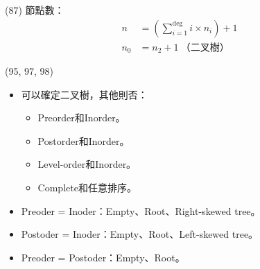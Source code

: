 \item \begin{theorem}{(87)} 節點數：\begin{equation}
        \begin{aligned}
            n & = (\sum_{i = 1}^{\deg}i \times n_i) + 1 \\
            n_0 & = n_2 + 1 \ \text{（二叉樹）}
        \end{aligned}
    \end{equation}
\end{theorem}

\item \begin{theorem}{(95, 97, 98)} \quad\quad \begin{itemize}
        \item 可以確定二叉樹，其他則否：\begin{itemize}
            \item Preorder和Inorder。
            \item Postorder和Inorder。
            \item Level-order和Inorder。
            \item Complete和任意排序。
        \end{itemize}
        \item Preoder = Inoder：Empty、Root、Right-skewed tree。
        \item Postoder = Inoder：Empty、Root、Left-skewed tree。
        \item Preoder = Postoder：Empty、Root。
    \end{itemize}
\end{theorem}

